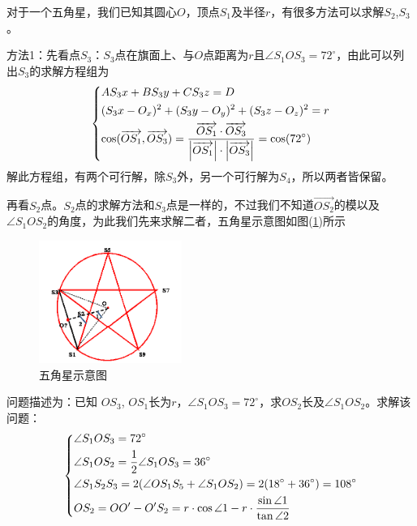             \par
            对于一个五角星，我们已知其圆心$O$，顶点$S_{1}$及半径$r$，有很多方法可以求解$S_{2}$,$S_{3}$。
            \par
            方法1：先看点$S_{3}$：$S_{3}$点在旗面上、与$O$点距离为$r$且$\angle{S_{1}OS_{3}}=72^\circ$，由此可以列出$S_{3}$的求解方程组为
            \begin{equation*}
            \centering
            \left\{\begin{lgathered}
            AS_3x+BS_3y+CS_3z=D\\
            (S_3x-O_x)^2+(S_3y-O_y)^2+(S_3z-O_z)^2=r\\
            \cos(\overrightarrow{OS_1},\overrightarrow{OS_3})=\frac{\overrightarrow{OS_1}\cdot\overrightarrow{OS_3}}{\left|\overrightarrow{OS_1}\right|\cdot\left|\overrightarrow{OS_3}\right|}=\cos(72^\circ)
             \end{lgathered} \right.
            \end{equation*}
            解此方程组，有两个可行解，除$S_{3}$外，另一个可行解为$S_{4}$，所以两者皆保留。
            \par
            再看$S_{2}$点。$S_{2}$点的求解方法和$S_{3}$点是一样的，不过我们不知道$\overrightarrow{OS_2}$的模以及$\angle{S_{1}OS_{2}}$的角度，为此我们先来求解二者，五角星示意图如图(\ref{fig:五角星示意图})所示
            \begin{figure}[H]
            \centering
            \includegraphics[height=4cm]{images/16.jpg}
            \caption{五角星示意图}
            \label{fig:五角星示意图}
            \end{figure}
            问题描述为：已知 $OS_3$, $OS_1$长为$r$，$\angle{S_{1}OS_{3}}=72^\circ$，求$OS_2$长及$\angle{S_{1}OS_{2}}$。求解该问题：
            \begin{equation*}
            \centering
            \left\{\begin{lgathered}
            \angle{S_1OS_3}=72^\circ\\
            \angle{S_1OS_2}=\frac{1}{2}\angle{S_1OS_3}=36^\circ\\
            \angle{S_1S_2S_3}=2(\angle{OS_1S_5}+\angle{S_1OS_2})=2(18^\circ+36^\circ)=108^\circ\\
            OS_2=OO'-O'S_2=r\cdot \cos\angle{1}-r\cdot \frac{\sin\angle{1}}{\tan\angle{2}}
            \end{lgathered} \right.
             \end{equation*}

